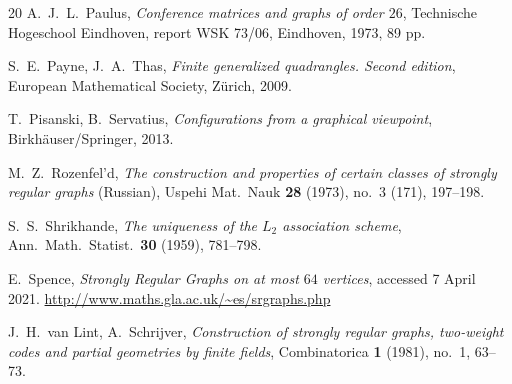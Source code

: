 \documentclass[12pt, reqno]{amsart}
\begin{document}
\begin{thebibliography}{20}
A.~J.~L.~Paulus, \emph{Conference matrices and graphs of order
$26$}, Technische Hogeschool Eindhoven, report WSK 73/06, Eindhoven,
1973, 89 pp.

S.~E.~Payne, J.~A.~Thas, \emph{Finite generalized quadrangles.
Second edition}, European Mathematical Society, Z\"{u}rich, 2009.

T.~Pisanski, B.~Servatius, \emph{Configurations from a
graphical viewpoint}, Birkh\"{a}user/Springer, 2013.

M.~Z.~Rozenfel'd, \emph{The construction and properties of certain
classes of strongly regular graphs} (Russian), Uspehi Mat.\ Nauk
\textbf{28} (1973), no.\ 3 (171), 197--198.

S.~S.~Shrikhande, \emph{The uniqueness of the $L_2$ association
scheme}, Ann.\ Math.\ Statist.\ \textbf{30} (1959), 781--798.

E.~Spence, \emph{Strongly Regular Graphs on at most $64$ vertices},
accessed 7 April 2021.
\url{http://www.maths.gla.ac.uk/~es/srgraphs.php}

J.~H.~van Lint, A.~Schrijver, \emph{Construction of strongly regular
graphs, two-weight codes and partial geometries by finite fields},
Combinatorica \textbf{1} (1981), no.\ 1, 63--73.

\end{thebibliography}
\end{document}
